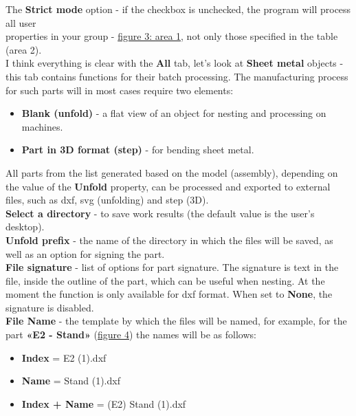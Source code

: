 \documentclass[a4paper,12pt]{article}
\begin{document}
The \textbf{Strict mode} option - if the checkbox is unchecked, the program will process all user\\properties in your group - \hyperref[sec:pref_specification]{figure 3: area 1}, not only those specified in the table (area 2).\\

I think everything is clear with the \textbf{All} tab, let’s look at \textbf{Sheet metal} objects - this tab contains functions for their batch processing. The manufacturing process for such parts will in most cases require two elements:

\begin{itemize}
	\item \textbf{Blank (unfold)} - a flat view of an object for nesting and processing on machines.
	\item \textbf{Part in 3D format (step)} - for bending sheet metal.
\end{itemize}

All parts from the list generated based on the model (assembly), depending on the value of the \textbf{Unfold} property, can be processed and exported to external files, such as dxf, svg (unfolding) and step (3D).\\

\textbf{Select a directory} - to save work results (the default value is the user's desktop).\\

\textbf{Unfold prefix} - the name of the directory in which the files will be saved, as well as an option for signing the part.\\

\textbf{File signature} - list of options for part signature. The signature is text in the file, inside the outline of the part, which can be useful when nesting. At the moment the function is only available for dxf format. When set to \textbf{None}, the signature is disabled.\\

\textbf{File Name} - the template by which the files will be named, for example, for the part \textbf{«E2 - Stand»} (\hyperref[sec:properties]{figure 4}) the names will be as follows:

\begin{itemize}
	\item \textbf{Index} = E2 (1).dxf
	\item \textbf{Name} = Stand (1).dxf
	\item \textbf{Index + Name} = (E2) Stand (1).dxf
\end{itemize}
\end{document}
